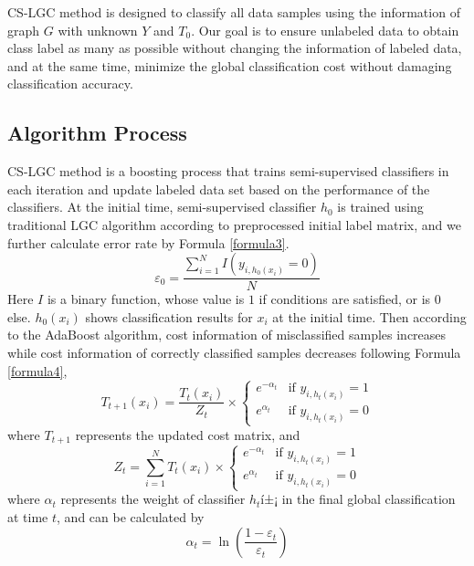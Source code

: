 \documentclass{svjour3}                     %
\begin{document}
CS-LGC method is designed to classify all data samples using the information of graph $G$ with unknown $Y$ and ${T_0}$. Our goal is to ensure unlabeled data to obtain class label as many as
possible without changing the information of labeled data, and at the same time, minimize the global  classification cost without damaging classification accuracy.
\subsection{Algorithm Process}
CS-LGC method is a boosting process that trains semi-supervised classifiers in each iteration and update labeled data set based on the performance of the classifiers.
At the initial time, semi-supervised classifier $h_0$ is trained using traditional LGC algorithm
according to preprocessed initial label matrix, and we further calculate error rate by Formula \ref{formula3}.
\begin{equation} \label{formula3}
  {\varepsilon _0} = \frac{{\mathop \sum \nolimits_{i = 1}^N I\left( {{y_{i,{h_0}\left( {{x_i}} \right)}} = 0} \right)}}{N}
\end{equation}
Here $I$ is a binary function, whose value is $1$ if conditions are satisfied, or is 0 else. ${h_0}\left( {{x_i}} \right)$ shows classification results for $x_i$ at the initial time. Then according to the AdaBoost algorithm, cost information of misclassified samples increases while cost information of correctly classified samples decreases following Formula \ref{formula4},
\begin{equation} \label{formula4}
  {T_{t + 1}}\left( {{x_i}} \right) = \frac{{{T_t}\left( {{x_i}} \right)}}{{{Z_t}}} \times 
  \begin{cases}
    {{e^{ - {\alpha_t}}}} & \text{if } {{y_{i,{h_t}\left( {{x_i}} \right)}} = 1} \\
    {{e^{{\alpha_t}}}} & \text{if } {{y_{i,{h_t}\left( {{x_i}} \right)}} = 0}
  \end{cases}
\end{equation}
where ${T_{t + 1}}$ represents the updated cost matrix, and
\begin{equation}
  {Z_t} = \mathop \sum \limits_{i = 1}^N {T_t}\left( {{x_i}} \right) \times 
  \begin{cases}
     {{e^{ - {\alpha_t}}}} & \text{if } {{y_{i,{h_t}\left( {{x_i}} \right)}} = 1} \\
     {{e^{{\alpha_t}}}} & \text{if } {{y_{i,{h_t}\left( {{x_i}} \right)}} = 0}   
  \end{cases}
\end{equation}
where ${\alpha _t}$ represents the weight of classifier $h_t$í±¡ in the final global classification at time $t$, and can be calculated by
\begin{equation}
  {\alpha _t} = \ln \left( {\frac{{1 - {\varepsilon _t}}}{{{\varepsilon _t}}}} \right)
\end{equation}
\end{document}
